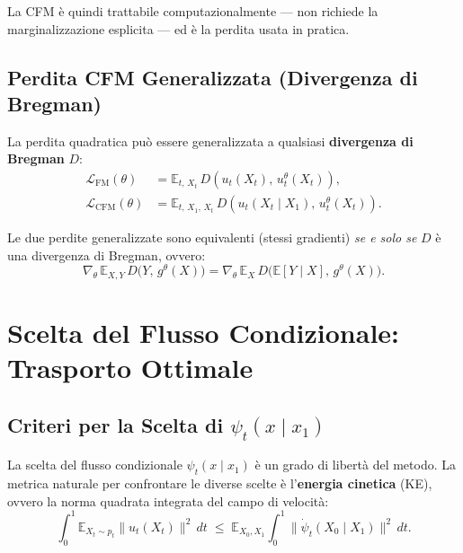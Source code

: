 La CFM è quindi trattabile computazionalmente — non richiede
la marginalizzazione esplicita — ed è la perdita usata in pratica.

\subsection{Perdita CFM Generalizzata (Divergenza di Bregman)}
\label{subsec:fm-bregman}

La perdita quadratica può essere generalizzata a qualsiasi
\textbf{divergenza di Bregman} $D$:
\begin{align}
  \mathcal{L}_{\mathrm{FM}}(\theta) &=
    \mathbb{E}_{t,\,X_t}\,D\!\left(u_t(X_t),\, u_t^\theta(X_t)\right), \\
  \mathcal{L}_{\mathrm{CFM}}(\theta) &=
    \mathbb{E}_{t,\,X_1,\,X_t}\,D\!\left(u_t(X_t \mid X_1),\, u_t^\theta(X_t)\right).
\end{align}

\begin{theorem}
  Le due perdite generalizzate sono equivalenti (stessi gradienti) \emph{se
  e solo se} $D$ è una divergenza di Bregman, ovvero:
  \begin{equation}
    \nabla_\theta\,\mathbb{E}_{X,Y}\,D\!\bigl(Y,\, g^\theta(X)\bigr)
    =
    \nabla_\theta\,\mathbb{E}_{X}\,D\!\bigl(\mathbb{E}[Y \mid X],\, g^\theta(X)\bigr).
  \end{equation}
\end{theorem}

\section{Scelta del Flusso Condizionale: Trasporto Ottimale}
\label{sec:fm-ot}

\subsection{Criteri per la Scelta di $\psi_t(x \mid x_1)$}
\label{subsec:fm-ot-criterion}

La scelta del flusso condizionale $\psi_t(x \mid x_1)$ è un grado di
libertà del metodo. La metrica naturale per confrontare le diverse scelte
è l'\textbf{energia cinetica} (KE), ovvero la norma quadrata integrata
del campo di velocità:
\begin{equation}
  \int_0^1 \mathbb{E}_{X_t \sim p_t}\|u_t(X_t)\|^2\,dt
  \;\le\;
  \mathbb{E}_{X_0, X_1}\int_0^1\|\dot\psi_t(X_0 \mid X_1)\|^2\,dt.
\end{equation}

